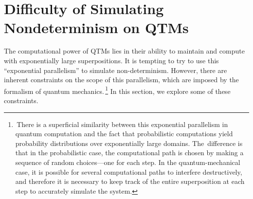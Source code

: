 \section{Difficulty of Simulating Nondeterminism on QTMs}
\label{section.rand.oracle}

The computational power of QTMs lies in their ability to
maintain and compute with expo\-nen\-tially large superpositions.
It is tempting to try to use this ``exponential parallelism''
to simulate non-determinism. However, there are inherent
constraints on the scope of this parallelism,
which are imposed by the formalism of quantum mechanics.\,\footnote{\,There
is a superficial similarity between this exponential parallelism
in quantum computation and the fact that probabilistic computations
yield probability distributions over exponentially large domains.
The~difference is that in the
probabilistic case, the computational path is chosen by making
a sequence of random choices---one for each step. In the quantum-mechanical
case, it is possible for several
computational paths to interfere destructively, and therefore it is
necessary to keep track of the entire superposition at each step to
accurately simulate the system.}
In this section, we explore some of these constraints.


